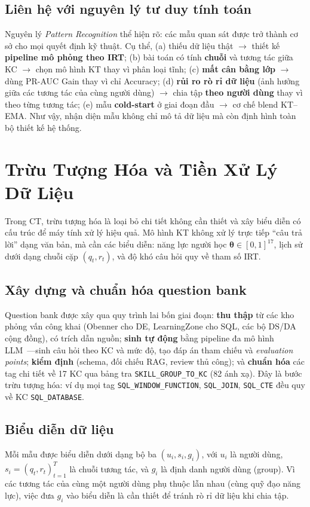 \documentclass[11pt]{article}
\newcommand{\prauc}{PR-AUC}
\begin{document}
\subsection{Liên hệ với nguyên lý tư duy tính toán}
Nguyên lý \textit{Pattern Recognition} thể hiện rõ: các mẫu quan sát được trở thành cơ sở cho mọi quyết định kỹ thuật. Cụ thể, (a) thiếu dữ liệu thật $\to$ thiết kế \textbf{pipeline mô phỏng theo IRT}; (b) bài toán có tính \textbf{chuỗi} và tương tác giữa KC $\to$ chọn mô hình KT thay vì phân loại tĩnh; (c) \textbf{mất cân bằng lớp} $\to$ dùng \prauc{} Gain thay vì chỉ Accuracy; (d) \textbf{rủi ro rò rỉ dữ liệu} (ảnh hưởng giữa các tương tác của cùng người dùng) $\to$ chia tập \textbf{theo người dùng} thay vì theo từng tương tác; (e) mẫu \textbf{cold-start} ở giai đoạn đầu $\to$ cơ chế blend KT--EMA. Như vậy, nhận diện mẫu không chỉ mô tả dữ liệu mà còn định hình toàn bộ thiết kế hệ thống.

\section{Trừu Tượng Hóa và Tiền Xử Lý Dữ Liệu}
Trong CT, trừu tượng hóa là loại bỏ chi tiết không cần thiết và xây biểu diễn có cấu trúc để máy tính xử lý hiệu quả. Mô hình KT không xử lý trực tiếp ``câu trả lời'' dạng văn bản, mà cần các biểu diễn: năng lực người học $\bm{\theta}\in[0,1]^{17}$, lịch sử dưới dạng chuỗi cặp $(q_t,r_t)$, và độ khó câu hỏi quy về tham số IRT.

\subsection{Xây dựng và chuẩn hóa question bank}
Question bank được xây qua quy trình lai bốn giai đoạn: \textbf{thu thập} từ các kho phỏng vấn công khai (Obenner cho DE, LearningZone cho SQL, các bộ DS/DA cộng đồng), có trích dẫn nguồn; \textbf{sinh tự động} bằng pipeline đa mô hình LLM~\cite{team2023gemini}---sinh câu hỏi theo KC và mức độ, tạo đáp án tham chiếu và \textit{evaluation points}; \textbf{kiểm định} (schema, đối chiếu RAG, review thủ công); và \textbf{chuẩn hóa} các tag chi tiết về 17 KC qua bảng tra \texttt{SKILL\_GROUP\_TO\_KC} (82 ánh xạ). Đây là bước trừu tượng hóa: ví dụ mọi tag \texttt{SQL\_WINDOW\_FUNCTION}, \texttt{SQL\_JOIN}, \texttt{SQL\_CTE} đều quy về KC \texttt{SQL\_DATABASE}.

\subsection{Biểu diễn dữ liệu}
Mỗi mẫu được biểu diễn dưới dạng bộ ba $(u_i, s_i, g_i)$, với $u_i$ là người dùng, $s_i=(q_t,r_t)_{t=1}^{T}$ là chuỗi tương tác, và $g_i$ là định danh người dùng (group). Vì các tương tác của cùng một người dùng phụ thuộc lẫn nhau (cùng quỹ đạo năng lực), việc đưa $g_i$ vào biểu diễn là cần thiết để tránh rò rỉ dữ liệu khi chia tập.
\end{document}
